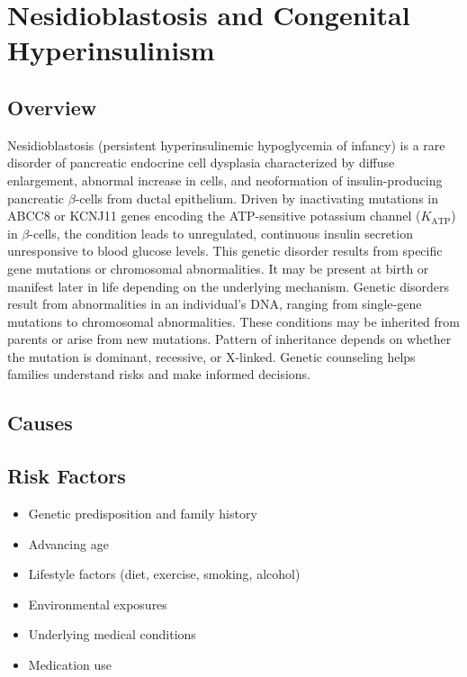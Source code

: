 \chapter{Nesidioblastosis and Congenital Hyperinsulinism}
\label{sec:Nesidioblastosis and Congenital Hyperinsulinism}

\section{Overview}
Nesidioblastosis (persistent hyperinsulinemic hypoglycemia of infancy) is a rare disorder of pancreatic endocrine cell dysplasia characterized by diffuse enlargement, abnormal increase in cells, and neoformation of insulin-producing pancreatic $\beta$-cells from ductal epithelium. Driven by inactivating mutations in ABCC8 or KCNJ11 genes encoding the ATP-sensitive potassium channel ($K_{\mathrm{ATP}}$) in $\beta$-cells, the condition leads to unregulated, continuous insulin secretion unresponsive to blood glucose levels. This genetic disorder results from specific gene mutations or chromosomal abnormalities. It may be present at birth or manifest later in life depending on the underlying mechanism. Genetic disorders result from abnormalities in an individual's DNA, ranging from single-gene mutations to chromosomal abnormalities. These conditions may be inherited from parents or arise from new mutations. Pattern of inheritance depends on whether the mutation is dominant, recessive, or X-linked. Genetic counseling helps families understand risks and make informed decisions.
\section{Causes}
\section{Risk Factors}

\begin{itemize}[noitemsep]
  \item Genetic predisposition and family history
  \item Advancing age
  \item Lifestyle factors (diet, exercise, smoking, alcohol)
  \item Environmental exposures
  \item Underlying medical conditions
  \item Medication use
\end{itemize}

